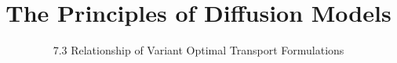﻿%

\graphicspath{{../images/}}
\title{The Principles of Diffusion Models}
\subtitle{7.3 Relationship of Variant Optimal Transport Formulations}


\begin{frame}
    \titlepage
\end{frame}



